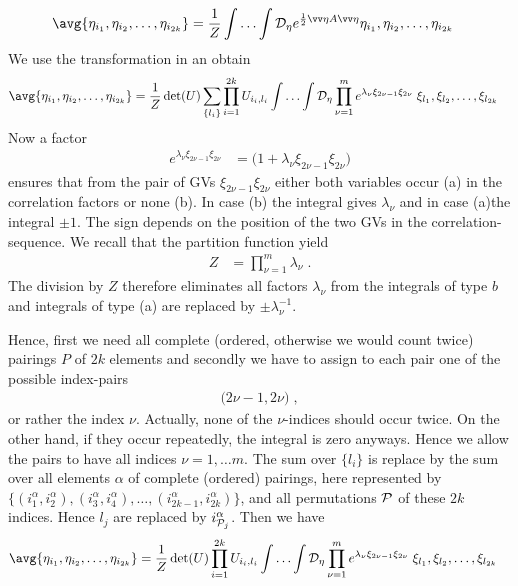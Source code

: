 %
\begin{align*}
\avg{\eta_{i_{1}},\eta_{i_{2}},\ldots, \eta_{i_{2k}} } &=\frac{1}{Z}
\Int \Deta 
e^{\frac{1}{2}\vv \eta A \vv \eta}
\eta_{i_{1}},\eta_{i_{2}},\ldots, \eta_{i_{2k}}
\end{align*}
%
We use the transformation in  an obtain
\begin{align*}
\avg{\eta_{i_{1}},\eta_{i_{2}},\ldots, \eta_{i_{2k}} } &=\frac{1}{Z}
    \det(U)   
    \sum_{\{l_{i}\}} 
    \prod_{i=1}^{2 k} U_{i_{i},l_{i}}
    \Int \Deta 
    \prod_{\nu=1}^{m} e^{\lambda_{\nu} \xi_{2\nu-1}\xi_{2\nu}}\;
\xi_{l_{1}},\xi_{l_{2}},\ldots, \xi_{l_{2k}}
\end{align*}
Now a factor 
%
\begin{align*}
e^{\lambda_{\nu} \xi_{2\nu-1}\xi_{2\nu}} &=\bigg( 1+\lambda_{\nu} \xi_{2\nu-1}\xi_{2\nu}\bigg)
\end{align*}
%
ensures that from the pair of GVs  $\xi_{2\nu-1}\xi_{2\nu}$ either both variables occur (a) 
in the correlation factors or none (b). In case (b) the integral gives $\lambda_{\nu}$ and in case (a)the integral $\pm 1$. The sign depends on the position of the two GVs in the correlation-sequence. We recall that the partition function yield
%
\begin{align*}
Z &= \prod_{\nu=1}^{m} \lambda_{\nu}\;.
\end{align*}
%
The division by $Z$ therefore eliminates all factors $\lambda_{\nu}$ from the integrals of type $b$ and integrals of type
(a) are replaced by $\pm\lambda_{\nu}^{-1}$.

Hence, first we need  all complete (ordered, otherwise we would count twice) pairings $P$ of $2k$ elements and secondly we have to assign to each pair one of the possible index-pairs
%
\begin{align*}
\big(2\nu-1,2\nu\big)\;,
\end{align*}
%
or rather the index $\nu$.
Actually, none of the $\nu$-indices  should occur twice. On the other hand,
if they occur repeatedly,  the integral is zero anyways. Hence we allow the pairs to
have all indices $\nu=1,\ldots m$.
The sum over $\{l_{i}\}$ is replace by the sum over all elements $\alpha$ of complete (ordered) pairings, here represented by
$\{(i_{1}^{\alpha},i_{2}^{\alpha}),(i_{3}^{\alpha},i_{4}^{\alpha}),\ldots,(i_{2k-1}^{\alpha},i_{2k}^{\alpha})\}$, and all permutations  ${\cal P} $ of these $2k$ indices. Hence
$l_{j}$ are replaced by $i^{\alpha}_{{\cal P} _{j}}$.
Then we have
%
\begin{align*}
\avg{\eta_{i_{1}},\eta_{i_{2}},\ldots, \eta_{i_{2k}} } &=\frac{1}{Z}
    \det(U)  
    \prod_{i=1}^{2 k} U_{i_{i},l_{i}}
    \Int \Deta 
    \prod_{\nu=1}^{m} e^{\lambda_{\nu} \xi_{2\nu-1}\xi_{2\nu}}\;
\xi_{l_{1}},\xi_{l_{2}},\ldots, \xi_{l_{2k}}
\end{align*}


